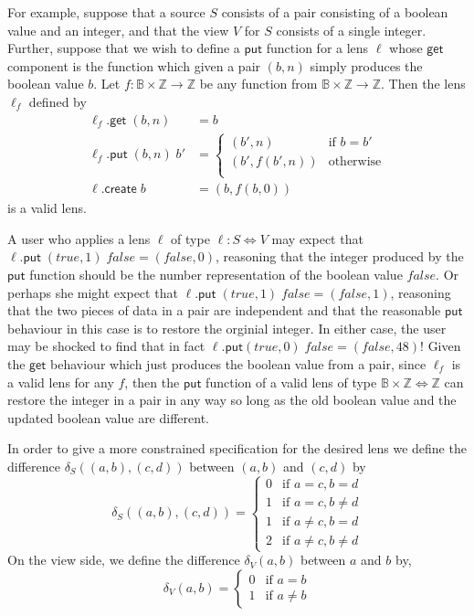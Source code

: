 \documentclass[acmsmall,review,anonymous]{acmart}\settopmatter{printfolios=true,printccs=false,printacmref=false}
\theoremstyle{definition}
\newcommand{\kw}[1]{\ensuremath{\mathsf{#1}}\xspace}
\newcommand{\get}{\ensuremath{\kw{get}}\xspace}
\newcommand{\pput}{\ensuremath{\kw{put}}\xspace}
\newcommand{\create}{\ensuremath{\kw{create}}\xspace}
\begin{document}
For example, suppose that a source $S$ consists of a pair consisting of a
boolean value and an integer, and that the view $V$ for $S$ consists of a
single integer. Further, suppose that we wish to define a \pput function for a
lens $\ell$ whose \get component is the function which given a pair $(b, n)$
simply produces the boolean value $b$. Let $f : \mathbb{B} \times \mathbb{Z}
\longrightarrow \mathbb{Z}$ be any function from $\mathbb{B} \times \mathbb{Z}
\longrightarrow \mathbb{Z}$. Then the lens $\ell_{f}$ defined by
\begin{align*}
\ell_{f}.\get \; (b, n) &= b\\
\ell_{f}.\pput \; (b, n) \; b' &= \begin{cases}
(b', n) & \text{if }b = b'\\
(b', f(b', n)) & \text{otherwise}\\
\end{cases}\\
\ell.\create \; b &= (b,f(b, 0))
\end{align*}
is a valid lens.

A user who applies a lens $\ell$ of type $\ell : S \Leftrightarrow V$ may expect
that $\ell.\pput \; (true, 1) \; false = (false, 0)$, reasoning that the
integer produced by the \pput function should be the number representation of
the boolean value $false$. Or perhaps she might expect that $\ell.\pput \;
(true, 1) \; false = (false, 1)$, reasoning that the two pieces of data in a
pair are independent and that the reasonable \pput behaviour in this case is to
restore the orginial integer. In either case, the user may be shocked to find
that in fact $\ell.\pput (true, 0) \; false = (false, 48)$! Given the \get
behaviour which just produces the boolean value from a pair, since $\ell_f$ is a
valid lens for any $f$, then the \pput function of a valid lens of type
$\mathbb{B} \times \mathbb{Z} \Leftrightarrow \mathbb{Z}$ can restore the
integer in a pair in any way so long as the old boolean value and the updated
boolean value are different.


In order to give a more constrained specification for the desired
lens we define the difference $\delta_S((a, b), (c, d))$ between $(a, b)$ and
$(c, d)$ by $$\delta_S((a, b), (c,
d)) = \begin{cases}
0 & \text{if }a = c, b = d\\
1 & \text{if }a=c, b \neq d\\
1 & \text{if }a \neq c, b = d\\
2 & \text{if }a \neq c, b \neq d
\end{cases}$$
On the view side, we define the difference $\delta_V(a, b)$
between $a$ and $b$ by, $$\delta_V(a, b) = \begin{cases}
0 & \text{if } a = b\\
1 & \text{if } a \neq b
\end{cases}$$
\end{document}
